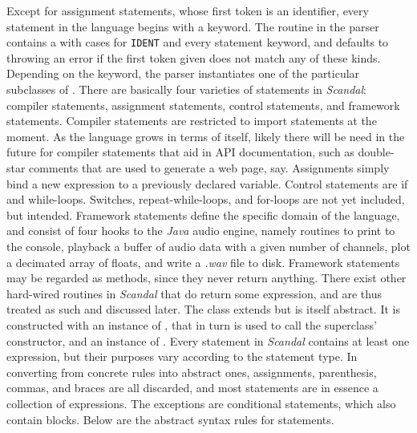 Except for assignment statements, whose first token is an identifier, every statement in the language begins with a keyword. The  routine in the parser contains a  with cases for \texttt{IDENT} and every statement keyword, and defaults to throwing an error if the first token given does not match any of these kinds. Depending on the keyword, the parser instantiates one of the particular subclasses of . There are basically four varieties of statements in \emph{Scandal}: compiler statements, assignment statements, control statements, and framework statements. Compiler statements are restricted to import statements at the moment. As the language grows in terms of itself, likely there will be need in the future for compiler statements that aid in API documentation, such as double-star comments that are used to generate a web page, say. Assignments simply bind a new expression to a previously declared variable. Control statements are if and while-loops. Switches, repeat-while-loops, and for-loops are not yet included, but intended. Framework statements define the specific domain of the language, and consist of four hooks to the \emph{Java} audio engine, namely routines to print to the console, playback a buffer of audio data with a given number of channels, plot a decimated array of floats, and write a \emph{.wav} file to disk. Framework statements may be regarded as  methods, since they never return anything. There exist other hard-wired routines in \emph{Scandal} that do return some expression, and are thus treated as such and discussed later. The  class extends  but is itself abstract. It is constructed with an instance of , that in turn is used to call the superclass' constructor, and an instance of . Every statement in \emph{Scandal} contains at least one expression, but their purposes vary according to the statement type. In converting from concrete rules into abstract ones, assignments, parenthesis, commas, and braces are all discarded, and most statements are in essence a collection of expressions. The exceptions are conditional statements, which also contain blocks. Below are the abstract syntax rules for statements.


